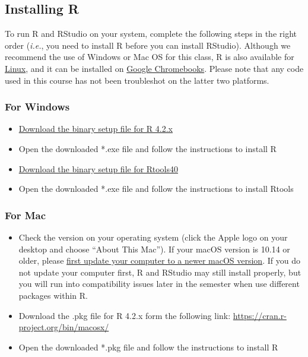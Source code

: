 \documentclass[
]{book}
\begin{document}
\hypertarget{installing-r}{%
\subsection{Installing R}\label{installing-r}}

To run R and RStudio on your system, complete the following steps in the right order (\emph{i.e.}, you need to install R before you can install RStudio). Although we recommend the use of Windows or Mac OS for this class, R is also available for \href{https://cran.r-project.org/bin/linux/ubuntu/}{Linux}, and it can be installed on \href{https://blog.sellorm.com/2018/12/20/installing-r-and-rstudio-on-a-chromebook/}{Google Chromebooks}. Please note that any code used in this course has not been troubleshot on the latter two platforms.

\hypertarget{for-windows}{%
\subsubsection*{For Windows}\label{for-windows}}

\begin{itemize}
\item
  \href{https://cran.r-project.org/bin/windows/base/}{Download the binary setup file for R 4.2.x}
\item
  Open the downloaded *.exe file and follow the instructions to install R
\item
  \href{https://cran.r-project.org/bin/windows/Rtools/}{Download the binary setup file for Rtools40}
\item
  Open the downloaded *.exe file and follow the instructions to install Rtools
\end{itemize}

\hypertarget{for-mac}{%
\subsubsection*{For Mac}\label{for-mac}}

\begin{itemize}
\item
  Check the version on your operating system (click the Apple logo on your desktop and choose ``About This Mac''). If your macOS version is 10.14 or older, please \href{https://support.apple.com/en-us/HT201541}{first update your computer to a newer macOS version}. If you do not update your computer first, R and RStudio may still install properly, but you will run into compatibility issues later in the semester when use different packages within R.
\item
  Download the .pkg file for R 4.2.x form the following link: \url{https://cran.r-project.org/bin/macosx/}
\item
  Open the downloaded *.pkg file and follow the instructions to install R
\end{itemize}
\end{document}
